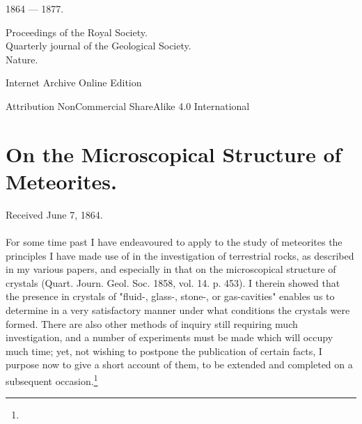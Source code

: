 \documentclass[a4paper, 12pt, oneside]{article}
\begin{document}
\begin{titlepage}
		
	\vspace*{\fill}%
	
	1864 --- 1877.%
	
	{\small Proceedings of the Royal Society. \\ Quarterly journal of the Geological Society. \\ Nature. } %

	\vspace{1\baselineskip} %

        Internet Archive Online Edition  %
	
	{\small Attribution NonCommercial ShareAlike 4.0 International } %
\end{titlepage}
\setlength{\parskip}{1mm plus1mm minus1mm}
\setcounter{tocdepth}{3}
\setcounter{secnumdepth}{3}
\pagestyle{fancy}
\fancyhf{}
\cfoot{\Fontauri{\thepage}}
\tableofcontents
\clearpage
\Large
\section{On the Microscopical Structure of Meteorites.
}
\begin{center}
Received June 7, 1864.
\end{center}
\paragraph{}
For some time past I have endeavoured to apply to the study of meteorites the principles I have made use of in the investigation of terrestrial rocks, as described in my various papers, and especially in that on the microscopical structure of crystals (Quart. Journ. Geol. Soc. 1858, vol. 14. p. 453). I therein showed that the presence in crystals of "fluid-, glass-, stone-, or gas-cavities" enables us to determine in a very satisfactory manner under what conditions the crystals were formed. There are also other methods of inquiry still requiring much investigation, and a number of experiments must be made which will occupy much time; yet, not wishing to postpone the publication of certain facts, I purpose now to give a short account of them, to be extended and completed on a subsequent occasion.\footnote{}
\end{document}
